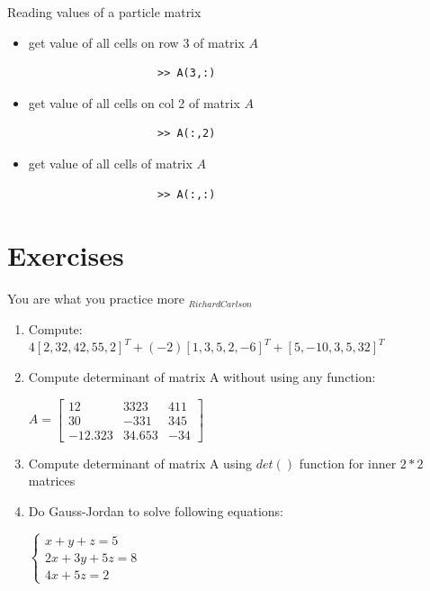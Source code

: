 \documentclass{beamer}
\begin{document}
\begin{frame}[fragile]{Reading values of a particle matrix}
	\begin{block}{}
		\begin{itemize}
			\item get value of all cells on row 3 of matrix $A$
			\java
				\begin{lstlisting}
					>> A(3,:)
				\end{lstlisting}
			\item get value of all cells on col 2 of matrix $A$
			\java
				\begin{lstlisting}
					>> A(:,2)
				\end{lstlisting}
			\item get value of all cells of matrix $A$
			\java
				\begin{lstlisting}
					>> A(:,:)
				\end{lstlisting}
		\end{itemize}
	\end{block}
\end{frame}

\section{Exercises}

\begin{frame}{You are what you practice more $_{Richard Carlson}$}
	\begin{block}{}
		\begin{enumerate}
			\item Compute:\\
			$4[2, 32, 42, 55, 2]^T + (-2)[1, 3, 5, 2, -6]^T + [5, -10, 3, 5, 32]^T$
			\item Compute determinant of matrix A without using any function:\\
			\begin{center}
				$A = \begin{bmatrix}
					12 & 3323 & 411\\
					30 & -331 & 345\\
					-12.323 & 34.653 & -34
				\end{bmatrix}$			
			\end{center}
			\item Compute determinant of matrix A using $det()$ function for inner $2*2$ matrices
			\item Do Gauss-Jordan to solve following equations:
			\begin{center}
			$
			\left\{
				\begin{array}{ll}
					x + y + z = 5  \\
					2x + 3y + 5z = 8 \\
					4x + 5z = 2 
				\end{array}
			\right.
			$
			\end{center}
		\end{enumerate}
	\end{block}
\end{frame}
\end{document}
